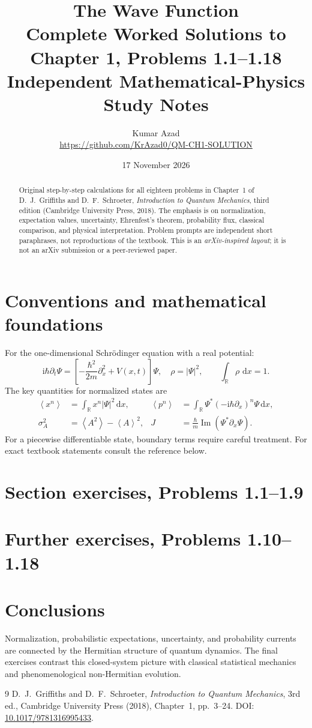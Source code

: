 \documentclass[11pt,a4paper]{article}
\title{\textbf{The Wave Function}\\[2mm]\large Complete Worked Solutions to Chapter 1, Problems 1.1--1.18\\[1mm]\normalsize Independent Mathematical-Physics Study Notes}
\author{Kumar Azad\\\small \url{https://github.com/KrAzad0/QM-CH1-SOLUTION}}
\date{17 November 2026}
\numberwithin{equation}{section}
\newcommand{\dd}{\,\mathrm{d}}
\newcommand{\ii}{\mathrm{i}}
\newcommand{\E}[1]{\left\langle #1\right\rangle}
\begin{document}
\maketitle
\begin{abstract}
Original step-by-step calculations for all eighteen problems in Chapter~1 of D.~J.~Griffiths and D.~F.~Schroeter, \emph{Introduction to Quantum Mechanics}, third edition (Cambridge University Press, 2018). The emphasis is on normalization, expectation values, uncertainty, Ehrenfest's theorem, probability flux, classical comparison, and physical interpretation. Problem prompts are independent short paraphrases, not reproductions of the textbook. This is an \emph{arXiv-inspired layout}; it is not an arXiv submission or a peer-reviewed paper.
\end{abstract}
\tableofcontents
\section{Conventions and mathematical foundations}
For the one-dimensional Schrödinger equation with a real potential:
\begin{equation}
\ii\hbar\partial_t\Psi=\left[-\frac{\hbar^2}{2m}\partial_x^2+V(x,t)\right]\Psi,\quad
\rho=|\Psi|^2,\qquad \int_{\mathbb R}\rho\,\dd x=1.
\end{equation}
The key quantities for normalized states are
\begin{align}
\E{x^n}&=\int_{\mathbb R} x^n|\Psi|^2\dd x,&
\E{p^n}&=\int_{\mathbb R}\Psi^*(-\ii\hbar\partial_x)^n\Psi\dd x,\\
\sigma_A^2&=\E{A^2}-\E A^2,&
J&=\frac{\hbar}{m}\operatorname{Im}(\Psi^*\partial_x\Psi).
\end{align}
For a piecewise differentiable state, boundary terms require careful treatment. For exact textbook statements consult the reference below.
\section{Section exercises, Problems 1.1--1.9}


\section{Further exercises, Problems 1.10--1.18}


\section*{Conclusions}
Normalization, probabilistic expectations, uncertainty, and probability currents are connected by the Hermitian structure of quantum dynamics. The final exercises contrast this closed-system picture with classical statistical mechanics and phenomenological non-Hermitian evolution.
\begin{thebibliography}{9}
 D.~J.~Griffiths and D.~F.~Schroeter, \emph{Introduction to Quantum Mechanics}, 3rd ed., Cambridge University Press (2018), Chapter~1, pp.~3--24. DOI: \href{https://doi.org/10.1017/9781316995433}{10.1017/9781316995433}.
\end{thebibliography}
\end{document}
